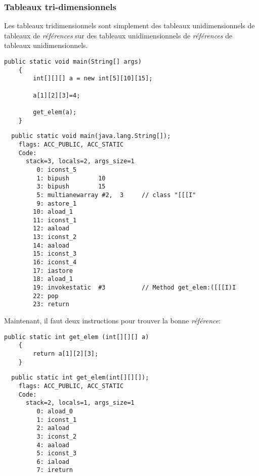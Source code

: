 \subsubsection{Tableaux tri-dimensionnels}

Les tableaux tridimensionnels sont simplement des tableaux unidimensionnels de
tableaux de \emph{références} sur des tableaux unidimensionnels de \emph{références}
de tableaux unidimensionnels.

\begin{lstlisting}[style=customjava]
	public static void main(String[] args)
	{
		int[][][] a = new int[5][10][15];

		a[1][2][3]=4;

		get_elem(a);
	}
\end{lstlisting}

\begin{lstlisting}
  public static void main(java.lang.String[]);
    flags: ACC_PUBLIC, ACC_STATIC
    Code:
      stack=3, locals=2, args_size=1
         0: iconst_5
         1: bipush        10
         3: bipush        15
         5: multianewarray #2,  3     // class "[[[I"
         9: astore_1
        10: aload_1
        11: iconst_1
        12: aaload
        13: iconst_2
        14: aaload
        15: iconst_3
        16: iconst_4
        17: iastore
        18: aload_1
        19: invokestatic  #3          // Method get_elem:([[[I)I
        22: pop
        23: return
\end{lstlisting}

Maintenant, il faut deux instructions  pour trouver la bonne \emph{référence}:

\begin{lstlisting}[style=customjava]
	public static int get_elem (int[][][] a)
	{
		return a[1][2][3];
	}
\end{lstlisting}

\begin{lstlisting}
  public static int get_elem(int[][][]);
    flags: ACC_PUBLIC, ACC_STATIC
    Code:
      stack=2, locals=1, args_size=1
         0: aload_0
         1: iconst_1
         2: aaload
         3: iconst_2
         4: aaload
         5: iconst_3
         6: iaload
         7: ireturn
\end{lstlisting}
